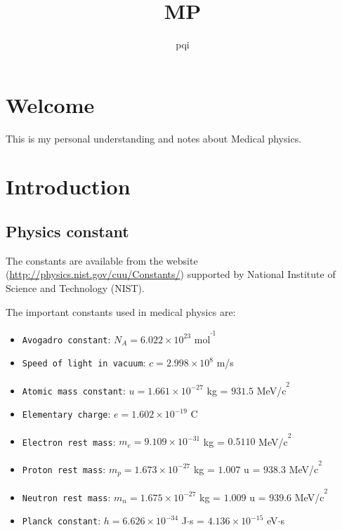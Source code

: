 \documentclass[]{book}
\title{MP}
\author{pqi}
\date{}
\providecommand{\tightlist}{%
  \setlength{\itemsep}{0pt}\setlength{\parskip}{0pt}}
\theoremstyle{definition}
\theoremstyle{definition}
\theoremstyle{definition}
\theoremstyle{remark}
\begin{document}
\maketitle

{
\hypersetup{linkcolor=black}
\setcounter{tocdepth}{1}
\tableofcontents
}
\chapter*{Welcome}\label{welcome}

This is my personal understanding and notes about Medical physics.

\chapter{Introduction}\label{introduction}

\section{Physics constant}\label{constants}

The constants are available from the website
(\url{http://physics.nist.gov/cuu/Constants/}) supported by National
Institute of Science and Technology (NIST).

The important constants used in medical physics are:

\begin{itemize}
\tightlist
\item
  \texttt{Avogadro\ constant}: \(N_A = 6.022\times10^{23}\)
  mol\textsuperscript{\textsuperscript{-1}}
\item
  \texttt{Speed\ of\ light\ in\ vacuum}: \(c = 2.998\times10^8\) m/s
\item
  \texttt{Atomic\ mass\ constant}: \(u = 1.661\times10^{−27}\) kg =
  \(931.5\) MeV/c\textsuperscript{\textsuperscript{2}}
\item
  \texttt{Elementary\ charge}: \(e = 1.602\times10^{−19}\) C
\item
  \texttt{Electron\ rest\ mass}: \(m_e = 9.109\times10^{−31}\) kg =
  \(0.5110\) MeV/c\textsuperscript{\textsuperscript{2}}
\item
  \texttt{Proton\ rest\ mass}: \(m_p = 1.673\times10^{−27}\) kg =
  \(1.007\) u = \(938.3\) MeV/c\textsuperscript{\textsuperscript{2}}
\item
  \texttt{Neutron\ rest\ mass}: \(m_n = 1.675\times10^{−27}\) kg =
  \(1.009\) u = \(939.6\) MeV/c\textsuperscript{\textsuperscript{2}}
\item
  \texttt{Planck\ constant}: \(h = 6.626×10^{−34}\) J\(\cdot\)s =
  \(4.136\times10^{−15}\) eV\(\cdot\)s
\end{itemize}
\end{document}
